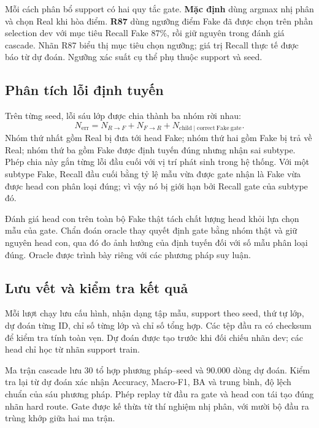 \documentclass[12pt,a4paper]{article}
\numberwithin{figure}{section}
\numberwithin{table}{section}
\numberwithin{equation}{section}
\begin{document}
Mỗi cách phân bổ support có hai quy tắc gate. \textbf{Mặc định} dùng argmax nhị phân và chọn Real khi hòa điểm. \textbf{R87} dùng ngưỡng điểm Fake đã được chọn trên phần selection dev với mục tiêu Recall Fake 87\%, rồi giữ nguyên trong đánh giá cascade. Nhãn R87 biểu thị mục tiêu chọn ngưỡng; giá trị Recall thực tế được báo từ dự đoán. Ngưỡng xác suất cụ thể phụ thuộc support và seed.

\subsection{Phân tích lỗi định tuyến}
Trên từng seed, lỗi sáu lớp được chia thành ba nhóm rời nhau:
\begin{equation}
N_{\mathrm{err}}=N_{R\rightarrow F}+N_{F\rightarrow R}
+N_{\mathrm{child}\mid\mathrm{correct\ Fake\ gate}}.
\label{eq:error-decomposition}
\end{equation}
Nhóm thứ nhất gồm Real bị đưa tới head Fake; nhóm thứ hai gồm Fake bị trả về Real; nhóm thứ ba gồm Fake được định tuyến đúng nhưng nhận sai subtype. Phép chia này gắn từng lỗi đầu cuối với vị trí phát sinh trong hệ thống. Với một subtype Fake, Recall đầu cuối bằng tỷ lệ mẫu vừa được gate nhận là Fake vừa được head con phân loại đúng; vì vậy nó bị giới hạn bởi Recall gate của subtype đó.

Đánh giá head con trên toàn bộ Fake thật tách chất lượng head khỏi lựa chọn mẫu của gate. Chẩn đoán oracle thay quyết định gate bằng nhóm thật và giữ nguyên head con, qua đó đo ảnh hưởng của định tuyến đối với số mẫu phân loại đúng. Oracle được trình bày riêng với các phương pháp suy luận.

\subsection{Lưu vết và kiểm tra kết quả}
Mỗi lượt chạy lưu cấu hình, nhận dạng tập mẫu, support theo seed, thứ tự lớp, dự đoán từng ID, chỉ số từng lớp và chỉ số tổng hợp. Các tệp đầu ra có checksum để kiểm tra tính toàn vẹn. Dự đoán được tạo trước khi đối chiếu nhãn dev; các head chỉ học từ nhãn support train.

Ma trận cascade lưu 30 tổ hợp phương pháp--seed và 90.000 dòng dự đoán. Kiểm tra lại từ dự đoán xác nhận Accuracy, Macro-F1, BA và trung bình, độ lệch chuẩn của sáu phương pháp. Phép replay từ đầu ra gate và head con tái tạo đúng nhãn hard route. Gate được kế thừa từ thí nghiệm nhị phân, với mười bộ đầu ra trùng khớp giữa hai ma trận.
\clearpage
\end{document}
